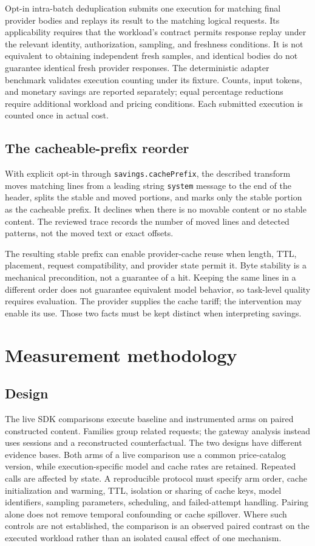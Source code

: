 \documentclass[11pt,a4paper]{article}
\begin{document}
Opt-in intra-batch deduplication submits one execution for matching final provider bodies and
replays its result to the matching logical requests. Its applicability requires that the
workload's contract permits response replay under the relevant identity, authorization, sampling,
and freshness conditions. It is not equivalent to obtaining independent fresh samples, and
identical bodies do not guarantee identical fresh provider responses. The deterministic adapter
benchmark validates execution counting under its fixture. Counts, input tokens, and monetary
savings are reported separately; equal percentage reductions require additional workload and
pricing conditions. Each submitted execution is counted once in actual cost.

\subsection{The cacheable-prefix reorder}\label{sec:reorden}
With explicit opt-in through \texttt{savings.cachePrefix}, the described transform moves
matching lines from a leading string \texttt{system} message to the end of the header, splits
the stable and moved portions, and marks only the stable portion as the cacheable prefix. It
declines when there is no movable content or no stable content. The reviewed trace records the
number of moved lines and detected patterns, not the moved text or exact offsets.

The resulting stable prefix can enable provider-cache reuse when length, TTL, placement, request
compatibility, and provider state permit it. Byte stability is a mechanical precondition, not a
guarantee of a hit. Keeping the same lines in a different order does not guarantee equivalent
model behavior, so task-level quality requires evaluation. The provider supplies the cache
tariff; the intervention may enable its use. Those two facts must be kept distinct when
interpreting savings.

\section{Measurement methodology}\label{sec:metodo}

\subsection{Design}
The live SDK comparisons execute baseline and instrumented arms on paired constructed content.
Families group related requests; the gateway analysis instead uses sessions and a reconstructed
counterfactual. The two designs have different evidence bases. Both arms of a live comparison use
a common price-catalog version, while execution-specific model and cache rates are retained.
Repeated calls are affected by state. A reproducible protocol must specify arm order, cache
initialization and warming, TTL, isolation or sharing of cache keys, model identifiers, sampling
parameters, scheduling, and failed-attempt handling. Pairing alone does not remove temporal
confounding or cache spillover. Where such controls are not established, the comparison is an
observed paired contrast on the executed workload rather than an isolated causal effect of one
mechanism.
\end{document}
